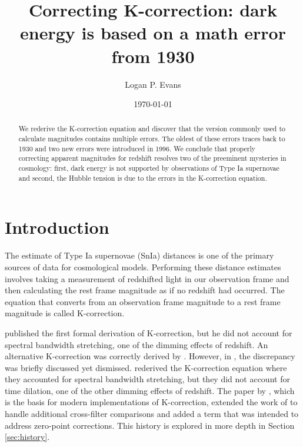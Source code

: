 \documentclass[aps,prl,reprint,amsmath]{revtex4-2}
\begin{document}
\title{Correcting K-correction: dark energy is based on a math error from 1930}

\author{Logan P. Evans}
 \noaffiliation

\date{\today}

\begin{abstract}
We rederive the K-correction equation and discover that the version commonly
used to calculate magnitudes contains multiple errors. The oldest of these
errors traces back to 1930 and two new errors were introduced in 1996. We
conclude that properly correcting apparent magnitudes for redshift resolves two
of the preeminent mysteries in cosmology: first, dark energy is not supported
by observations of Type Ia supernovae and second, the Hubble tension is due to
the errors in the K-correction equation.
\end{abstract}

\maketitle

\section{Introduction}

The estimate of Type Ia supernovae (SnIa) distances is one of the primary
sources of data for cosmological models. Performing these distance estimates
involves taking a measurement of redshifted light in our observation frame and
then calculating the rest frame magnitude as if no redshift had occurred. The
equation that converts from an observation frame magnitude to a rest frame
magnitude is called K-correction.

\citet{tolman1930} published the first formal derivation of K-correction, but
he did not account for spectral bandwidth stretching, one of the dimming
effects of redshift. An alternative K-correction was correctly derived by
\citet{desitter1934}. However, in \citet{hubble1935}, the discrepancy was
briefly discussed yet dismissed. \citet{oke1968} rederived the K-correction
equation where they accounted for spectral bandwidth stretching, but they did
not account for time dilation, one of the other dimming effects of redshift.
The paper by \citet{kim1996}, which is the basis for modern implementations of
K-correction, extended the work of \citet{oke1968} to handle additional
cross-filter comparisons and added a term that was intended to address
zero-point corrections. This history is explored in more depth in Section
\ref{sec:history}.
\end{document}
